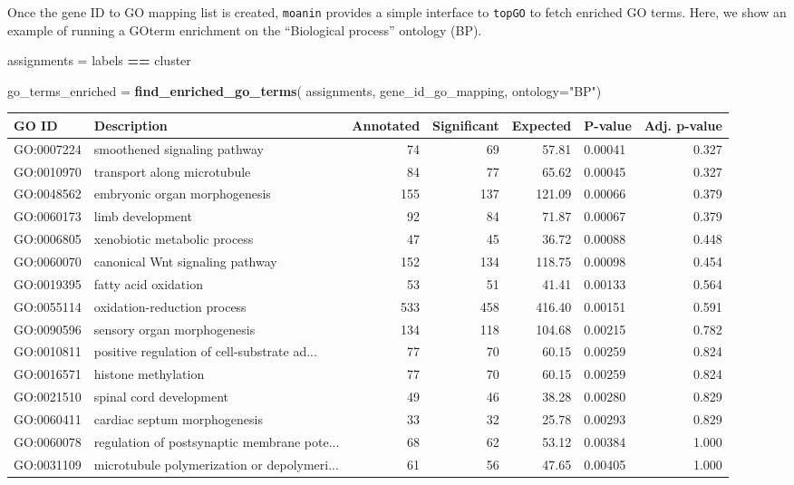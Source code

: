 \documentclass[9pt,a4paper,]{extarticle}
\newenvironment{Shaded}{\begin{snugshade}}{\end{snugshade}}
\newcommand{\DataTypeTok}[1]{\textcolor[rgb]{0.13,0.29,0.53}{#1}}
\newcommand{\KeywordTok}[1]{\textcolor[rgb]{0.13,0.29,0.53}{\textbf{#1}}}
\newcommand{\NormalTok}[1]{#1}
\newcommand{\OperatorTok}[1]{\textcolor[rgb]{0.81,0.36,0.00}{\textbf{#1}}}
\newcommand{\StringTok}[1]{\textcolor[rgb]{0.31,0.60,0.02}{#1}}
\begin{document}
Once the gene ID to GO mapping list is created, \texttt{moanin} provides a simple
interface to \texttt{topGO} to fetch enriched GO terms. Here, we show an example of
running a GOterm enrichment on the ``Biological process'' ontology (BP).

\begin{Shaded}
\begin{Highlighting}[]
\NormalTok{assignments =}\StringTok{ }\NormalTok{labels }\OperatorTok{==}\StringTok{ }\NormalTok{cluster}

\NormalTok{go_terms_enriched =}\StringTok{ }\KeywordTok{find_enriched_go_terms}\NormalTok{(}
\NormalTok{    assignments,}
\NormalTok{    gene_id_go_mapping, }\DataTypeTok{ontology=}\StringTok{"BP"}\NormalTok{)}
\end{Highlighting}
\end{Shaded}

\begin{tabular}{llrrrlr}
\toprule
GO ID & Description & Annotated & Significant & Expected & P-value & Adj. p-value\\
\midrule
GO:0007224 & smoothened signaling pathway & 74 & 69 & 57.81 & 0.00041 & 0.327\\
GO:0010970 & transport along microtubule & 84 & 77 & 65.62 & 0.00045 & 0.327\\
GO:0048562 & embryonic organ morphogenesis & 155 & 137 & 121.09 & 0.00066 & 0.379\\
GO:0060173 & limb development & 92 & 84 & 71.87 & 0.00067 & 0.379\\
GO:0006805 & xenobiotic metabolic process & 47 & 45 & 36.72 & 0.00088 & 0.448\\
\addlinespace
GO:0060070 & canonical Wnt signaling pathway & 152 & 134 & 118.75 & 0.00098 & 0.454\\
GO:0019395 & fatty acid oxidation & 53 & 51 & 41.41 & 0.00133 & 0.564\\
GO:0055114 & oxidation-reduction process & 533 & 458 & 416.40 & 0.00151 & 0.591\\
GO:0090596 & sensory organ morphogenesis & 134 & 118 & 104.68 & 0.00215 & 0.782\\
GO:0010811 & positive regulation of cell-substrate ad... & 77 & 70 & 60.15 & 0.00259 & 0.824\\
\addlinespace
GO:0016571 & histone methylation & 77 & 70 & 60.15 & 0.00259 & 0.824\\
GO:0021510 & spinal cord development & 49 & 46 & 38.28 & 0.00280 & 0.829\\
GO:0060411 & cardiac septum morphogenesis & 33 & 32 & 25.78 & 0.00293 & 0.829\\
GO:0060078 & regulation of postsynaptic membrane pote... & 68 & 62 & 53.12 & 0.00384 & 1.000\\
GO:0031109 & microtubule polymerization or depolymeri... & 61 & 56 & 47.65 & 0.00405 & 1.000\\
\bottomrule
\end{tabular}
\end{document}
